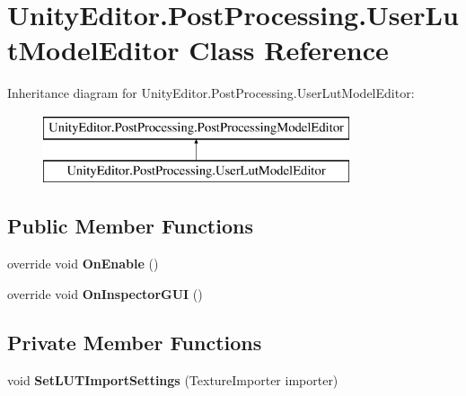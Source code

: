 \hypertarget{class_unity_editor_1_1_post_processing_1_1_user_lut_model_editor}{}\section{Unity\+Editor.\+Post\+Processing.\+User\+Lut\+Model\+Editor Class Reference}
\label{class_unity_editor_1_1_post_processing_1_1_user_lut_model_editor}
Inheritance diagram for Unity\+Editor.\+Post\+Processing.\+User\+Lut\+Model\+Editor\+:\begin{figure}[H]
\begin{center}
\leavevmode
\includegraphics[height=2.000000cm]{class_unity_editor_1_1_post_processing_1_1_user_lut_model_editor}
\end{center}
\end{figure}
\subsection*{Public Member Functions}
\begin{DoxyCompactItemize}
\item 
\mbox{\label{class_unity_editor_1_1_post_processing_1_1_user_lut_model_editor_af7261e180a19f86a6379cd13d76fec2e}} 
override void {\bfseries On\+Enable} ()
\item 
\mbox{\label{class_unity_editor_1_1_post_processing_1_1_user_lut_model_editor_aebca737810782e9837ddd81529ac8542}} 
override void {\bfseries On\+Inspector\+G\+UI} ()
\end{DoxyCompactItemize}
\subsection*{Private Member Functions}
\begin{DoxyCompactItemize}
\item 
\mbox{\label{class_unity_editor_1_1_post_processing_1_1_user_lut_model_editor_a0e59864bd5df8023e485e2f2c03e630a}} 
void {\bfseries Set\+L\+U\+T\+Import\+Settings} (Texture\+Importer importer)
\end{DoxyCompactItemize}
